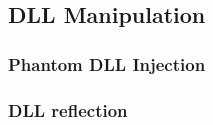\subsection{DLL Manipulation}

\subsubsection{Phantom DLL Injection}

\subsubsection{DLL reflection}
